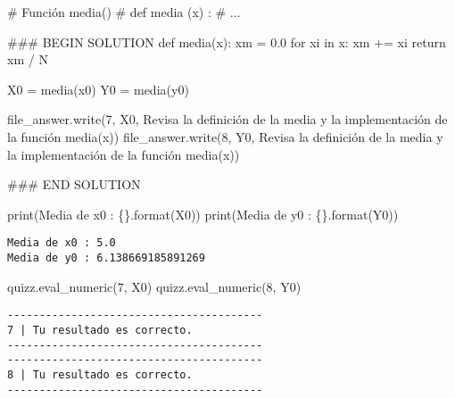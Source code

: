 \documentclass[
  letterpaper,
  DIV=11,
  numbers=noendperiod]{scrreprt}
\newenvironment{Shaded}{\begin{snugshade}}{\end{snugshade}}
\newcommand{\BuiltInTok}[1]{\textcolor[rgb]{0.00,0.23,0.31}{#1}}
\newcommand{\CommentTok}[1]{\textcolor[rgb]{0.37,0.37,0.37}{#1}}
\newcommand{\ControlFlowTok}[1]{\textcolor[rgb]{0.00,0.23,0.31}{#1}}
\newcommand{\FloatTok}[1]{\textcolor[rgb]{0.68,0.00,0.00}{#1}}
\newcommand{\KeywordTok}[1]{\textcolor[rgb]{0.00,0.23,0.31}{#1}}
\newcommand{\NormalTok}[1]{\textcolor[rgb]{0.00,0.23,0.31}{#1}}
\newcommand{\OperatorTok}[1]{\textcolor[rgb]{0.37,0.37,0.37}{#1}}
\newcommand{\RegionMarkerTok}[1]{\textcolor[rgb]{0.00,0.23,0.31}{#1}}
\newcommand{\SpecialCharTok}[1]{\textcolor[rgb]{0.37,0.37,0.37}{#1}}
\newcommand{\StringTok}[1]{\textcolor[rgb]{0.13,0.47,0.30}{#1}}
\begin{document}
\begin{Shaded}
\begin{Highlighting}[]
\CommentTok{\# Función media()}
\CommentTok{\# def media (x) : }
\CommentTok{\# ...}

\CommentTok{\#\#\# }\RegionMarkerTok{BEGIN}\CommentTok{ SOLUTION}
\KeywordTok{def}\NormalTok{ media(x):}
\NormalTok{    xm }\OperatorTok{=} \FloatTok{0.0}
    \ControlFlowTok{for}\NormalTok{ xi }\KeywordTok{in}\NormalTok{ x:}
\NormalTok{        xm }\OperatorTok{+=}\NormalTok{ xi}
    \ControlFlowTok{return}\NormalTok{ xm }\OperatorTok{/}\NormalTok{ N}

\NormalTok{X0 }\OperatorTok{=}\NormalTok{ media(x0)}
\NormalTok{Y0 }\OperatorTok{=}\NormalTok{ media(y0)}

\NormalTok{file\_answer.write(}\StringTok{\textquotesingle{}7\textquotesingle{}}\NormalTok{, X0, }\StringTok{\textquotesingle{}Revisa la definición de la media y la implementación de la función media(x)\textquotesingle{}}\NormalTok{)}
\NormalTok{file\_answer.write(}\StringTok{\textquotesingle{}8\textquotesingle{}}\NormalTok{, Y0, }\StringTok{\textquotesingle{}Revisa la definición de la media y la implementación de la función media(x)\textquotesingle{}}\NormalTok{)}

\CommentTok{\#\#\# }\RegionMarkerTok{END}\CommentTok{ SOLUTION}

\BuiltInTok{print}\NormalTok{(}\StringTok{\textquotesingle{}Media de x0 : }\SpecialCharTok{\{\}}\StringTok{\textquotesingle{}}\NormalTok{.}\BuiltInTok{format}\NormalTok{(X0))}
\BuiltInTok{print}\NormalTok{(}\StringTok{\textquotesingle{}Media de y0 : }\SpecialCharTok{\{\}}\StringTok{\textquotesingle{}}\NormalTok{.}\BuiltInTok{format}\NormalTok{(Y0))}
\end{Highlighting}
\end{Shaded}

\begin{verbatim}
Media de x0 : 5.0
Media de y0 : 6.138669185891269
\end{verbatim}

\begin{Shaded}
\begin{Highlighting}[]
\NormalTok{quizz.eval\_numeric(}\StringTok{\textquotesingle{}7\textquotesingle{}}\NormalTok{, X0)}
\NormalTok{quizz.eval\_numeric(}\StringTok{\textquotesingle{}8\textquotesingle{}}\NormalTok{, Y0)}
\end{Highlighting}
\end{Shaded}

\begin{verbatim}
----------------------------------------
7 | Tu resultado es correcto.
----------------------------------------
----------------------------------------
8 | Tu resultado es correcto.
----------------------------------------
\end{verbatim}
\end{document}
